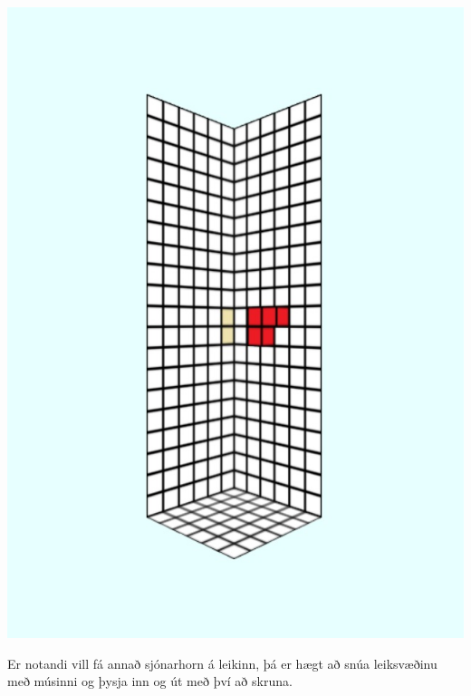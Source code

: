 \documentclass[12pt]{article}
\begin{document}
\begin{small}
\begin{center}
\includegraphics[scale=0.4]{m3}
\end{center}
Er notandi vill fá annað sjónarhorn á leikinn, þá er hægt að snúa leiksvæðinu með músinni og þysja inn og út með því að skruna.
\begin{center}

\end{center}
\end{small}
\end{document}
